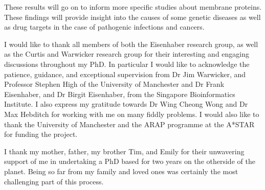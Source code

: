 \documentclass[12pt,PhD,twoside]{muthesis}
\begin{document}
These results will go on to inform more specific studies about membrane proteins.
These findings will provide insight into the causes of some genetic diseases as well as drug targets in the case of pathogenic infections and cancers.






\afterabstract{} %

I would like to thank all members of both the Eisenhaber research group, as well as the Curtis and Warwicker research group for their interesting and engaging discussions throughout my PhD.
In particular I would like to acknowledge the patience, guidance, and exceptional supervision from Dr Jim Warwicker, and Professor Stephen High of the University of Manchester and Dr Frank Eisenhaber, and Dr Birgit Eisenhaber, from the Singapore Bioinformatics Institute.
I also express my gratitude towards Dr Wing Cheong Wong and Dr Max Hebditch for working with me on many fiddly problems.
I would also like to thank the University of Manchester and the ARAP programme at the A*STAR for funding the project.

I thank my mother, father, my brother Tim, and Emily for their unwavering support of me in undertaking a PhD based for two years on the otherside of the planet.
Being so far from my family and loved ones was certainly the most challenging part of this process.




\end{document}
